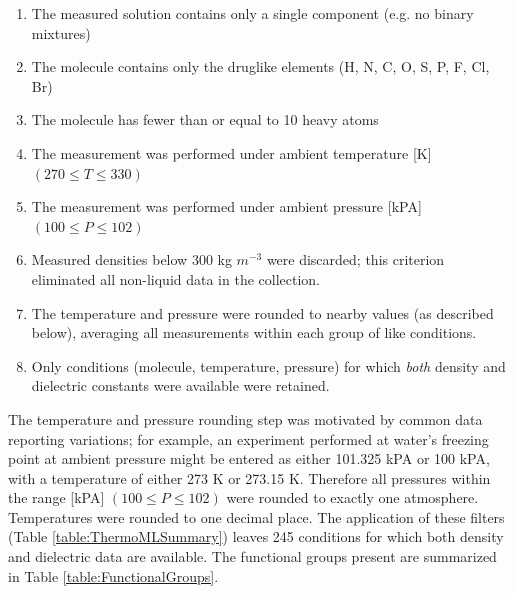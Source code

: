 \documentclass[aps,pre,twocolumn,nofootinbib,superscriptaddress,linenumbers]{revtex4-1}
\begin{document}
\begin{enumerate}
 \item The measured solution contains only a single component (e.g. no binary mixtures)
 \item The molecule contains only the druglike elements (H, N, C, O, S, P, F, Cl, Br)
 \item The molecule has fewer than or equal to 10 heavy atoms
 \item The measurement was performed under ambient temperature [K] $(270 \le T \le 330)$
 \item The measurement was performed under ambient pressure [kPA] $(100 \le P \le 102)$
 \item Measured densities below 300 kg $m^{-3}$ were discarded; this criterion eliminated all non-liquid data in the collection.
 \item The temperature and pressure were rounded to nearby values (as described below), averaging all measurements within each group of like conditions.
 \item Only conditions (molecule, temperature, pressure) for which \emph{both} density and dielectric constants were available were retained.  
\end{enumerate}
The temperature and pressure rounding step was motivated by common data reporting variations; for example, an experiment performed at water's freezing point at ambient pressure might be entered as either 101.325 kPA or 100 kPA, with a temperature of either 273 K or 273.15 K.  
Therefore all pressures within the range [kPA] $(100 \le P \le 102)$ were rounded to exactly one atmosphere.  
Temperatures were rounded to one decimal place.  
The application of these filters (Table \ref{table:ThermoMLSummary}) leaves 245 conditions for which both density and dielectric data are available.  
The functional groups present are summarized in Table \ref{table:FunctionalGroups}.  

\end{document}
